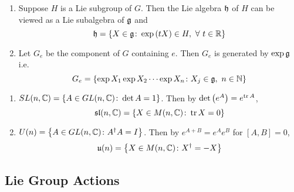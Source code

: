 \documentclass[a4paper,12pt]{article}
\begin{document}
	\begin{thm}
		\begin{enumerate}
			\item Suppose $H$ is a Lie subgroup of $G$. Then the Lie algebra $\mathfrak{h}$ of $H$ can be viewed as a Lie subalgebra of $\mathfrak{g}$ and
			\begin{equation*}
				\mathfrak{h} = \left\{X \in \mathfrak{g} \colon \exp{(tX)} \in H,~\forall~ t \in \mathbb{R}\right\}
			\end{equation*}
			\item Let $G_e$ be the component of $G$ containing $e$. Then $G_e$ is generated by $\exp \mathfrak{g}$ i.e.
			\begin{equation*}
				G_e = \left\{\exp X_1 \exp X_2 \cdots \exp X_n \colon X_j \in \mathfrak{g},~n \in \mathbb{N}\right\}
			\end{equation*}
		\end{enumerate}
	\end{thm}
	\begin{exam}
		\begin{enumerate}
			\item $SL(n,\mathbb{C}) = \left\{A \in GL(n,\mathbb{C}) \colon \det A = 1\right\}$. Then by $\det\left(e^A\right) = e^{\operatorname{tr} A}$,
			\begin{equation*}
				\mathfrak{sl}(n,\mathbb{C}) = \left\{X \in M(n,\mathbb{C}) \colon \operatorname{tr} X = 0\right\}
			\end{equation*}
			\item $U(n) = \left\{A \in GL(n,\mathbb{C}) \colon A^{\dagger}A = I\right\}$. Then by $e^{A+B} = e^Ae^B$ for $[A,B] = 0$,
			\begin{equation*}
				\mathfrak{u}(n) = \left\{X \in M(n,\mathbb{C}) \colon X^{\dagger} = -X\right\}
			\end{equation*}
		\end{enumerate}
	\end{exam}
	
	\subsection{Lie Group Actions}
\end{document}
